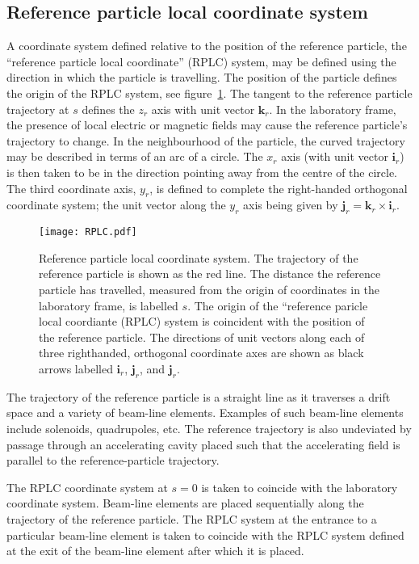 \subsection{Reference particle local coordinate system}

A coordinate system defined relative to the position of the reference
particle, the ``reference particle local coordinate'' (RPLC) system,
may be defined using the direction in which the particle is
travelling. 
The position of the particle defines the origin of the RPLC system,
see figure~\ref{fig:RPLC}.
The tangent to the reference particle trajectory at $s$ defines the
$z_r$ axis with unit vector $\bm{k}_r$.
In the laboratory frame, the presence of local electric or magnetic
fields may cause the reference particle's trajectory to change.
In the neighbourhood of the particle, the curved trajectory may be
described in terms of an arc of a circle.
The $x_r$ axis (with unit vector $\bm{i}_r$) is then
taken to be in the direction pointing away from the centre of the
circle. 
The third coordinate axis, $y_r$, is defined to complete the
right-handed orthogonal coordinate system; the unit vector along the
$y_r$ axis being given by
$\bm{j}_r = \bm{k}_r \times \bm{i}_r$.
\begin{figure}
  \begin{center}
    \texttt{[image: RPLC.pdf]}
  \end{center}
  \caption{
    Reference particle local coordinate system.
    The trajectory of the reference particle is shown as the red line.
    The distance the reference particle has travelled, measured from
    the origin of coordinates in the laboratory frame, is labelled
    $s$.
    The origin of the ``reference paricle local coordiante (RPLC)
    system is coincident with the position of the reference particle.
    The directions of unit vectors along each of three righthanded,
    orthogonal coordinate axes are shown as black arrows labelled
    $\bm{i}_r$, $\bm{j}_r$, and $\bm{j}_r$. 
  }
  \label{fig:RPLC}
\end{figure}

The trajectory of the reference particle is a straight line as it
traverses a drift space and a variety of beam-line elements.
Examples of such beam-line elements include solenoids, quadrupoles,
etc.
The reference trajectory is also undeviated by passage through an
accelerating cavity placed such that the accelerating field is 
parallel to the reference-particle trajectory.

The RPLC coordinate system at $s=0$ is taken to coincide with the
laboratory coordinate system.
Beam-line elements are placed sequentially along the trajectory of the
reference particle.
The RPLC system at the entrance to a particular beam-line element is
taken to coincide with the RPLC system defined at the exit of the
beam-line element after which it is placed.

